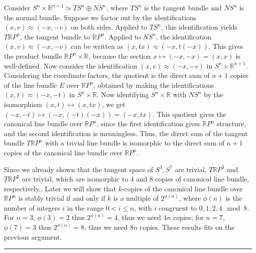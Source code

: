 \begin{exmp} Consider $S^n\times \mathbb{R}^{n+1}\simeq TS^n\oplus NS^n$, where $TS^n$ is the tangent bundle and $NS^n$ is the normal bundle. Suppose we factor out by the identifications $(x,v)\approx (-x,-v)$ on both sides. Applied to $TS^n$, this identification yields $T\mathbb{R}P^n$, the tangent bundle to $\mathbb{R}P^n$. Applied to $NS^n$, the identification $(x,v)\approx (-x,-v)$ can be written as $(x,tx)\approx (-x,t(-x))$. This gives the product bundle $\mathbb{R}P^n\times \mathbb{R}$, because the section $x\mapsto (-x,-x)=(x,x)$ is well-defined. Now consider the identification $(x,v)\approx (-x,-v)$ in $S^n\times \mathbb{R}^{n+1}$. Considering the coordinate factors, the quotient is the direct sum of $n+1$ copies of the line bundle $E$ over $\mathbb{R}P^n$, obtained by making the identifications $(x,t)\approx (-x,-t)$ in $S^n\times \mathbb{R}$. Now identifying $S^n\times \mathbb{R}$ with $NS^n$ by the isomorphism $(x,t)\mapsto (x,tx)$, we get $(-x,-t)\mapsto (-x,(-t)(-x))=(-x,tx)$. This quotient gives the canonical line bundle over $\mathbb{R}P^n$, since the first identification gives $\mathbb{R}P^n$ structure, and the second identification is meaningless. Thus, the direct sum of the tangent bundle $T\mathbb{R}P^n$ with a trivial line bundle is isomorphic to the direct sum of $n+1$ copies of the canonical line bundle over $\mathbb{R}P^n$.

Since we already shown that the tangent space of $S^3, S^7$ are trivial, $T\mathbb{R}P^3$ and $T\mathbb{R}P^7$ are trivial, which are isomorphic to 4 and 8 copies of canonical line bundle, respectively.. Later we will show that $k$-copies of the canonical line bundle over $\mathbb{R}P^n$ is stably trivial if and only if $k$ is a multiple of $2^{\phi(n)}$, where $\phi(n)$ is the number of integers $i$ in the range $0<i\leq n$, with $i$ congruent to $0,1,2,4 \mod 8$. For $n=3$, $\phi(3)=2$ thus $2^{\phi(n)}=4$, thus we need $4n$ copies; for $n=7$, $\phi(7)=3$ thus $2^{\phi(n)}=8$, thus we need $8n$ copies. These results fits on the previous argument.
\end{exmp}
\noindent\rule{\textwidth}{1pt}
\newline
